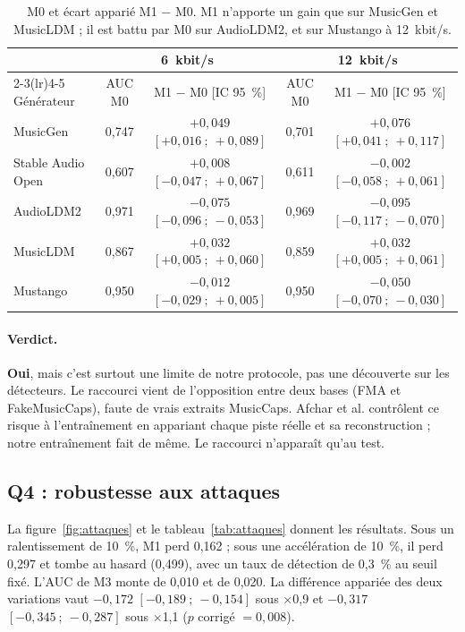 \documentclass[a4paper, 11pt]{article}
\begin{document}
\begin{table}[h]
    \centering
    \small
    \begin{tabular}{lcccc}
        \toprule
        & \multicolumn{2}{c}{6~kbit/s} & \multicolumn{2}{c}{12~kbit/s} \\
        \cmidrule(lr){2-3}\cmidrule(lr){4-5}
        Générateur & AUC M0 & M1 $-$ M0 [IC 95~\%] & AUC M0 & M1 $-$ M0 [IC 95~\%] \\
        \midrule
        MusicGen          & 0,747 & $+0{,}049$ $[+0{,}016~;~+0{,}089]$ & 0,701 & $+0{,}076$ $[+0{,}041~;~+0{,}117]$ \\
        Stable Audio Open & 0,607 & $+0{,}008$ $[-0{,}047~;~+0{,}067]$ & 0,611 & $-0{,}002$ $[-0{,}058~;~+0{,}061]$ \\
        AudioLDM2         & 0,971 & $-0{,}075$ $[-0{,}096~;~-0{,}053]$ & 0,969 & $-0{,}095$ $[-0{,}117~;~-0{,}070]$ \\
        MusicLDM          & 0,867 & $+0{,}032$ $[+0{,}005~;~+0{,}060]$ & 0,859 & $+0{,}032$ $[+0{,}005~;~+0{,}061]$ \\
        Mustango          & 0,950 & $-0{,}012$ $[-0{,}029~;~+0{,}005]$ & 0,950 & $-0{,}050$ $[-0{,}070~;~-0{,}030]$ \\
        \bottomrule
    \end{tabular}
    \caption{M0 et écart apparié M1 $-$ M0. M1 n'apporte un gain que sur MusicGen et MusicLDM ; il est
    battu par M0 sur AudioLDM2, et sur Mustango à 12~kbit/s.}
    \label{tab:m1m0}
\end{table}

\paragraph{Verdict.} \textbf{Oui}, mais c'est surtout une limite de notre protocole, pas une découverte sur les
détecteurs. Le raccourci vient de l'opposition entre deux bases (FMA et FakeMusicCaps), faute de vrais extraits
MusicCaps. Afchar et al. contrôlent ce risque à l'entraînement en appariant chaque piste réelle et sa
reconstruction \cite{afchar2024easy} ; notre entraînement fait de même.
Le raccourci n'apparaît qu'au test.

\subsection{Q4 : robustesse aux attaques}

La figure~\ref{fig:attaques} et le tableau~\ref{tab:attaques} donnent les résultats. Sous un ralentissement de
10~\%, M1 perd 0,162 ; sous une accélération de 10~\%, il perd 0,297 et tombe au hasard (0,499), avec un taux de
détection de 0,3~\% au seuil fixé. L'AUC de M3 monte de 0,010 et de 0,020. La différence appariée des deux
variations vaut $-0{,}172$ $[-0{,}189~;~-0{,}154]$ sous $\times$0,9 et $-0{,}317$ $[-0{,}345~;~-0{,}287]$ sous
$\times$1,1 ($p$ corrigé $= 0{,}008$).
\end{document}
